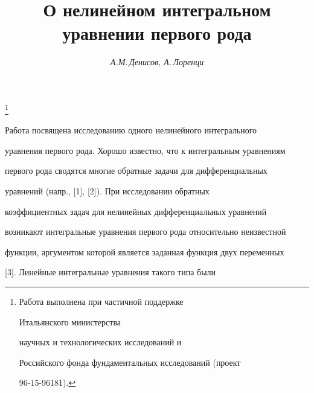 








\author{\it А.М.\,Денисов, А.\,Лоренци}




\title{О нелинейном интегральном уравнении первого рода}


\thanks{Работа выполнена при частичной поддержке


Итальянского министерства


научных и технологических исследований и


Российского фонда фундаментальных исследований (проект


96-15-96181).}





\date{}




\pagestyle{plain} %







\maketitle


\label{begin}





Работа посвящена исследованию одного нелинейного интегрального


уравнения первого рода. Хорошо известно, что к интегральным уравнениям


первого рода сводятся многие обратные задачи для дифференциальных


уравнений (напр., [1], [2]). При исследовании обратных


коэффициентных задач для нелинейных дифференциальных уравнений


возникают интегральные уравнения первого рода относительно неизвестной


функции, аргументом которой является заданная функция двух переменных


[3]. Линейные интегральные уравнения такого типа были


